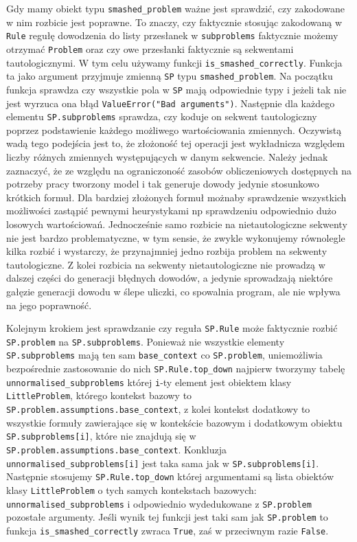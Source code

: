 \documentclass{article}
\begin{document}
Gdy mamy obiekt typu \texttt{smashed\_problem} ważne jest sprawdzić, czy zakodowane w nim rozbicie jest poprawne. To znaczy, czy faktycznie stosując zakodowaną w \texttt{Rule} regułę dowodzenia do listy przesłanek w 
\texttt{subproblems} faktycznie możemy otrzymać \texttt{Problem} oraz czy owe przesłanki faktycznie są sekwentami tautologicznymi. W tym celu używamy funkcji \texttt{is\_smashed\_correctly}. Funkcja ta jako argument 
przyjmuje zmienną \texttt{SP} typu \texttt{smashed\_problem}. Na początku funkcja sprawdza czy wszystkie pola w \texttt{SP} mają odpowiednie typy i jeżeli tak nie jest wyrzuca ona błąd \texttt{ValueError("Bad arguments")}.  
Następnie dla każdego elementu \texttt{SP.subproblems} sprawdza, czy koduje on sekwent tautologiczny poprzez podstawienie każdego możliwego wartościowania zmiennych. Oczywistą wadą tego podejścia jest to, że złożoność 
tej operacji jest wykładnicza względem liczby różnych zmiennych występujących w danym sekwencie. Należy jednak zaznaczyć, że ze względu na ograniczoność zasobów obliczeniowych dostępnych na potrzeby pracy tworzony model
i tak generuje dowody jedynie stosunkowo krótkich formuł. Dla bardziej złożonych formuł możnaby sprawdzenie wszystkich możliwości zastąpić pewnymi heurystykami np sprawdzeniu odpowiednio dużo losowych wartościowań.
Jednocześnie samo rozbicie na nietautologiczne sekwenty nie jest bardzo problematyczne, w tym sensie, że zwykle wykonujemy równolegle kilka rozbić i wystarczy, że przynajmniej jedno rozbija problem na sekwenty tautologiczne.
Z kolei rozbicia na sekwenty nietautologiczne nie prowadzą w dalszej części do generacji błędnych dowodów, a jedynie sprowadzają niektóre gałęzie generacji dowodu w ślepe uliczki, co spowalnia program, ale nie wpływa
na jego poprawność. 

Kolejnym krokiem jest sprawdzanie czy reguła \texttt{SP.Rule} może faktycznie rozbić \texttt{SP.problem} na \texttt{SP.subproblems}. Ponieważ nie wszystkie elementy \texttt{SP.subproblems} mają ten sam \texttt{base\_context} 
co \texttt{SP.problem}, uniemożliwia bezpośrednie zastosowanie do nich \texttt{SP.Rule.top\_down} najpierw tworzymy tabelę \texttt{unnormalised\_subproblems} której \texttt{i}-ty element jest obiektem klasy \texttt{LittleProblem}, którego kontekst bazowy to \texttt{SP.problem.assumptions.base\_context},
z kolei kontekst dodatkowy to wszystkie formuły zawierające się w kontekście bazowym i dodatkowym obiektu \texttt{SP.subproblems[i]}, które nie znajdują się w \texttt{SP.problem.assumptions.base\_context}. Konkluzja 
\texttt{unnormalised\_subproblems[i]} jest taka sama jak w \texttt{SP.subproblems[i]}. Następnie stosujemy \texttt{SP.Rule.top\_down} której argumentami są lista obiektów klasy \texttt{LittleProblem} o tych samych
kontekstach bazowych: \texttt{unnormalised\_subproblems} i odpowiednio wydedukowane z 
\texttt{SP.problem} pozostałe argumenty. Jeśli wynik tej funkcji jest taki sam jak \texttt{SP.problem} to funkcja \texttt{is\_smashed\_correctly} zwraca \texttt{True}, zaś w przeciwnym razie \texttt{False}.
\end{document}
